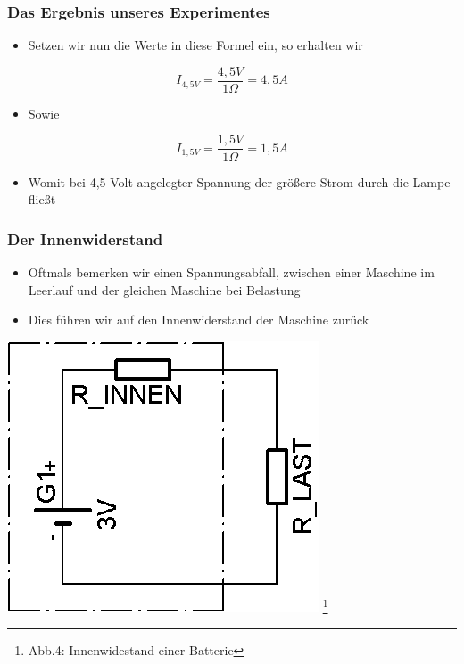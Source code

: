 \begin{frame}
	\frametitle{Das Ergebnis unseres Experimentes}
	\begin{itemize}
		\item	Setzen wir nun die Werte in diese Formel ein, so erhalten wir
	\end{itemize}
	\begin{equation}
		I_{4,5 V} = \frac{4,5 V}{1 \Omega} = 4,5 A
	\end{equation}
	\begin{itemize}
		\item Sowie
	\end{itemize}
	\begin{equation}
		I_{1,5 V} = \frac{1,5 V}{1 \Omega} = 1,5 A
	\end{equation}
	\begin{itemize}
		\item	Womit bei 4,5 Volt angelegter Spannung der größere Strom durch die Lampe fließt
	\end{itemize}
\end{frame}

\begin{frame}
	\frametitle{Der Innenwiderstand}
	\begin{itemize}
		\item	Oftmals bemerken wir einen Spannungsabfall, zwischen einer Maschine im Leerlauf und der gleichen Maschine bei Belastung
		\item	Dies führen wir auf den Innenwiderstand der Maschine zurück
	\end{itemize}
	\begin{center}
 		\includegraphics[scale=1.4]{e03/Innenwiderstand.png}
 		\footnote{Abb.4: Innenwidestand einer Batterie}
 	\end{center}
\end{frame}

